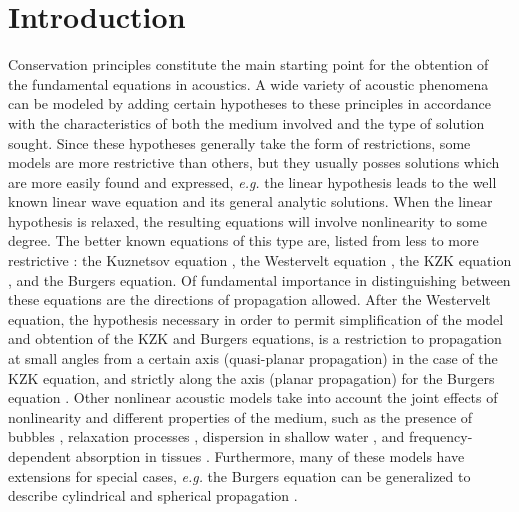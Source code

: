 

\section{Introduction}  
\label{sec:introduction} 


Conservation principles constitute the main starting point for the obtention of the fundamental equations in acoustics. 
A wide variety of acoustic phenomena can be modeled by adding certain hypotheses to these principles in accordance with the characteristics of both the medium involved and the type of solution sought. 
Since these hypotheses generally take the form of restrictions, some models are more restrictive than others, but they usually posses solutions which are more easily found and expressed, {\em e.g.} the linear hypothesis leads to the well known linear wave equation and its general analytic solutions. 
When the linear hypothesis is relaxed, the resulting equations will involve nonlinearity to some degree. 
The better known equations of this type are, listed from less to more restrictive \citep{clason2009boundary, hamilton1998model}:
the Kuznetsov equation \citep{kuznetsov1971equations}, 
the Westervelt equation \citep{westervelt}, 
the KZK equation \citep{kuznetsov1971equations,zabolotskaya1969quasi}, 
and the Burgers equation. 
Of fundamental importance in distinguishing between these equations are the directions of propagation allowed. 
After the Westervelt equation, the hypothesis necessary in order to permit simplification of the model and obtention of the KZK and Burgers equations, is a restriction to propagation at small angles from a certain axis (quasi-planar propagation) in the case of the KZK equation, and strictly along the axis (planar propagation) for the Burgers equation \citep{hamilton1998model}. 
Other nonlinear acoustic models take into account the joint effects of nonlinearity and different properties of the medium, such as 
the presence of bubbles \citep{sutin1998nonlinear}, 
relaxation processes \citep{johnson2003effect}, 
dispersion in shallow water \citep{infeld2000nonlinear}, 
and frequency-dependent absorption in tissues \citep{duck}. 
Furthermore, many of these models have extensions for special cases, {\em e.g.} the Burgers equation can be generalized to describe cylindrical and spherical propagation \citep{crighton1979asymptotic}.

